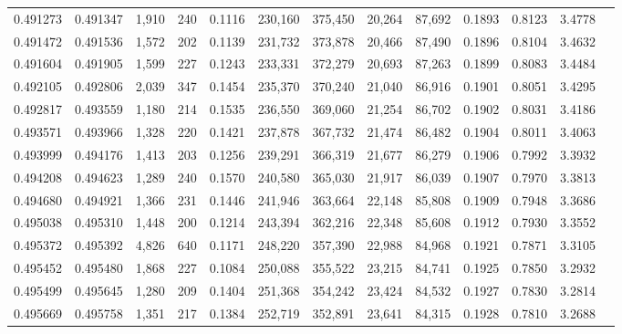 \begin{tabular}{rrrrrrrrrrrrr}
0.491273 & 0.491347 &  1,910 &   240 &                                     0.1116 & 230,160 & 375,450 &  20,264 &  87,692 & 0.1893 & 0.8123 & 3.4778 \\
0.491472 & 0.491536 &  1,572 &   202 &                                     0.1139 & 231,732 & 373,878 &  20,466 &  87,490 & 0.1896 & 0.8104 & 3.4632 \\
0.491604 & 0.491905 &  1,599 &   227 &                                     0.1243 & 233,331 & 372,279 &  20,693 &  87,263 & 0.1899 & 0.8083 & 3.4484 \\
0.492105 & 0.492806 &  2,039 &   347 &                                     0.1454 & 235,370 & 370,240 &  21,040 &  86,916 & 0.1901 & 0.8051 & 3.4295 \\
0.492817 & 0.493559 &  1,180 &   214 &                                     0.1535 & 236,550 & 369,060 &  21,254 &  86,702 & 0.1902 & 0.8031 & 3.4186 \\
0.493571 & 0.493966 &  1,328 &   220 &                                     0.1421 & 237,878 & 367,732 &  21,474 &  86,482 & 0.1904 & 0.8011 & 3.4063 \\
0.493999 & 0.494176 &  1,413 &   203 &                                     0.1256 & 239,291 & 366,319 &  21,677 &  86,279 & 0.1906 & 0.7992 & 3.3932 \\
0.494208 & 0.494623 &  1,289 &   240 &                                     0.1570 & 240,580 & 365,030 &  21,917 &  86,039 & 0.1907 & 0.7970 & 3.3813 \\
0.494680 & 0.494921 &  1,366 &   231 &                                     0.1446 & 241,946 & 363,664 &  22,148 &  85,808 & 0.1909 & 0.7948 & 3.3686 \\
0.495038 & 0.495310 &  1,448 &   200 &                                     0.1214 & 243,394 & 362,216 &  22,348 &  85,608 & 0.1912 & 0.7930 & 3.3552 \\
0.495372 & 0.495392 &  4,826 &   640 &                                     0.1171 & 248,220 & 357,390 &  22,988 &  84,968 & 0.1921 & 0.7871 & 3.3105 \\
0.495452 & 0.495480 &  1,868 &   227 &                                     0.1084 & 250,088 & 355,522 &  23,215 &  84,741 & 0.1925 & 0.7850 & 3.2932 \\
0.495499 & 0.495645 &  1,280 &   209 &                                     0.1404 & 251,368 & 354,242 &  23,424 &  84,532 & 0.1927 & 0.7830 & 3.2814 \\
0.495669 & 0.495758 &  1,351 &   217 &                                     0.1384 & 252,719 & 352,891 &  23,641 &  84,315 & 0.1928 & 0.7810 & 3.2688 \\

\end{tabular}
